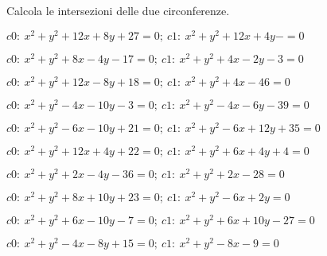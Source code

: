 \newpage
\begin{esercizio}\label{ese:}
 Calcola le intersezioni delle due circonferenze.
 \begin{enumeratea}
  \item  \(c0:~x^2 + y^2 +12x +8y +27 = 0;~c1:~x^2 + y^2 +12x +4y - = 0\)\\
   \makebox[\linewidth][r]
   {[\(ar:~y = -7;~A \punto{-10}{-7};~B \punto{-2}{-7}\)]}
  \item  \(c0:~x^2 + y^2 +8x -4y -17 = 0;~c1:~x^2 + y^2 +4x -2y -3 = 0\)\\
   \makebox[\linewidth][r]
   {[\(ar:~y = 2x -7;~\emptyset\)]}
  \item  \(c0:~x^2 + y^2 +12x -8y +18 = 0;~c1:~x^2 + y^2 +4x -46 = 0\)\\
   \makebox[\linewidth][r]
   {[\(ar:~y = x +8;~A \punto{-1}{7};~B \punto{-9}{-1}\)]}
  \item  \(c0:~x^2 + y^2 -4x -10y -3 = 0;~c1:~x^2 + y^2 -4x -6y -39 = 0\)\\
   \makebox[\linewidth][r]
   {[\(ar:~y = 9;~A \punto{6}{9};~B \punto{-2}{9}\)]}
  \item  \(c0:~x^2 + y^2 -6x -10y +21 = 0;~c1:~x^2 + y^2 -6x +12y +35 = 0\)\\
   \makebox[\linewidth][r]
   {[\(ar:~y = -\frac{7}{11};~\emptyset\)]}
  \item  \(c0:~x^2 + y^2 +12x +4y +22 = 0;~c1:~x^2 + y^2 +6x +4y +4 = 0\)\\
   \makebox[\linewidth][r]
   {[\(ar:~x = -3;~A \punto{-3}{1};~B \punto{-3}{1}\)]}
  \item  \(c0:~x^2 + y^2 +2x -4y -36 = 0;~c1:~x^2 + y^2 +2x -28 = 0\)\\
   \makebox[\linewidth][r]
   {[\(ar:~y = -2;~A \punto{-6}{-2};~B \punto{4}{-2}\)]}
  \item  \(c0:~x^2 + y^2 +8x +10y +23 = 0;~c1:~x^2 + y^2 -6x +2y  = 0\)\\
   \makebox[\linewidth][r]
   {[\(ar:y = -\frac{7}{4}x -\frac{23}{8};~\emptyset\)]}
  \item  \(c0:~x^2 + y^2 +6x -10y -7 = 0;~c1:~x^2 + y^2 +6x +10y -27 = 0\)\\
   \makebox[\linewidth][r]
   {[\(ar:~y = 1;~A \punto{-8}{1};~B \punto{2}{1}\)]}
  \item  \(c0:~x^2 + y^2 -4x -8y +15 = 0;~c1:~x^2 + y^2 -8x -9 = 0\)\\
   \makebox[\linewidth][r]
   {[\(ar:~y = \frac{1}{2} x +3;~A \punto{0}{3};~B \punto{4}{5}\)]}
 \end{enumeratea}
\end{esercizio}


